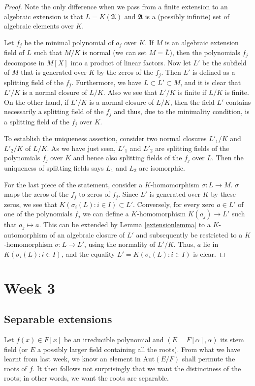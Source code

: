 \documentclass[12pt]{report}
\theoremstyle{definition}
\def\AA{\mathfrak{A}}
\def\Aut{\text{Aut}}
\def\aa{\alpha}
\begin{document}
\begin{proof} 
    Note the only difference when we pass from a finite extension to an algebraic extension is that $L=K(\AA)$ and $\AA$ is a (possibly infinite) set of algebraic elements over $K$.
    
    Let $f_j$ be the minimal polynomial of $a_j$ over $K$. If $M$ is an algebraic extension field of $L$ such that $M/K$ is normal (we can set $M=\overline{L}$), then the polynomials $f_j$ decompose in $M[X]$ into a product of linear factors. Now let $L'$ be the subfield of $M$ that is generated over $K$ by the zeros of the $f_j$. Then $L'$ is defined as a splitting field of the $f_j$. Furthermore, we have $L \subset L' \subset M$, and it is clear that $L'/K$ is a normal closure of $L/K$. Also we see that $L'/K$ is finite if $L/K$ is finite. On the other hand, if $L'/K$ is a normal closure of $L/K$, then the field $L'$ contains necessarily a splitting field of the $f_j$ and thus, due to the minimality condition, is a splitting field of the $f_j$ over $K$.


    To establish the uniqueness assertion, consider two normal closures $L'_1/K$ and $L'_2/K$ of $L/K$. As we have just seen, $L'_1$ and $L'_2$ are splitting fields of the polynomials $f_j$ over $K$ and hence also splitting fields of the $f_j$ over $L$. Then the uniqueness of splitting fields says $L_1$ and $L_2$ are isomorphic.


    For the last piece of the statement, consider a $K$-homomorphism $\sigma : L \to M$. $\sigma$ maps the zeros of the $f_j$ to zeros of $f_j$. Since $L'$ is generated over $K$ by these zeros, we see that $K(\sigma_i(L): i \in I) \subset L'$. Conversely, for every zero $a \in L'$ of one of the polynomials $f_j$ we can define a $K$-homomorphism $K(a_j) \to L'$ such that $a_j \mapsto a$. This can be extended by Lemma \ref{extensionlemma} to a $K$-automorphism of an algebraic closure of $L'$ and subsequently be restricted to a $K$-homomorphism $\sigma : L \to L'$, using the normality of $L'/K$. Thus, $a$ lie in $K(\sigma_i(L): i \in I)$, and the equality $L' = K(\sigma_i(L): i \in I)$ is clear.
\end{proof}

\chapter*{Week 3}
\setcounter{chapter}{3}

\section{Separable extensions}
Let $f(x)\in F[x]$ be an irreducible polynomial and $(E=F[\aa],\aa)$ its stem field (or $E$ a possibly larger field containing all the roots). From what we have learnt from last week, we know an element in $\Aut(E/F)$ shall permute the roots of $f$. It then follows not surprisingly that we want the distinctness of the roots; in other words, we want the roots are separable.
\end{document}
